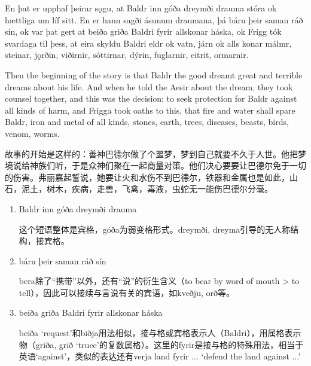 \begin{paracol}{2}
    En þat er upphaf þeirar sǫgu, at Baldr inn góða dreymði drauma stóra ok hættliga um líf sitt. En er hann sagði ásunum draumana, þá báru þeir saman ráð sín, ok var þat gert at beiða griða Baldri fyrir allskonar háska, ok Frigg tók svardaga til þess, at eira skyldu Baldri eldr ok vatn, járn ok alls konar málmr, steinar, jǫrðin, viðirnir, sóttirnar, dýrin, fuglarnir, eitrit, ormarnir.

    \switchcolumn

    Then the beginning of the story is that Baldr the good dreamt great and terrible dreams about his life. And when he told the Aesir about the dream, they took counsel together, and this was the decision: to seek protection for Baldr against all kinds of harm, and Frigga took oaths to this, that fire and water shall spare Baldr, iron and metal of all kinds, stones, earth, trees, diseases, beasts, birds, venom, worms.
\end{paracol}
\begin{translation*}{}
    故事的开始是这样的：善神巴德尔做了个噩梦，梦到自己就要不久于人世。他把梦境说给神族们听，于是众神们聚在一起商量对策。他们决心要要让巴德尔免于一切的伤害。弗丽嘉起誓说，她要让火和水伤不到巴德尔，铁器和金属也是如此，山石，泥土，树木，疾病，走兽，飞禽，毒液，虫蛇无一能伤巴德尔分毫。
\end{translation*}
\begin{grammar*}{}
    \begin{enumerate}[leftmargin=*]
        \item Baldr inn góða dreymði drauma

              这个短语整体是宾格，góða为弱变格形式。dreymði, dreyma引导的无人称结构，接宾格。

        \item báru þeir saman ráð sín

              bera除了“携带”以外，还有“说”的衍生含义（to bear by word of mouth > to tell），因此可以接续与言说有关的宾语，如kveðju, orð等。

        \item beiða griða Baldri fyrir allskonar háska

              beiða `request'和biðja用法相似，接与格或宾格表示人（Baldri），用属格表示物（griða, grið `truce'的复数属格）。这里的fyrir是接与格的特殊用法，相当于英语`against'，类似的表达还有verja land fyrir ... `defend the land against ...'
    \end{enumerate}
\end{grammar*}

